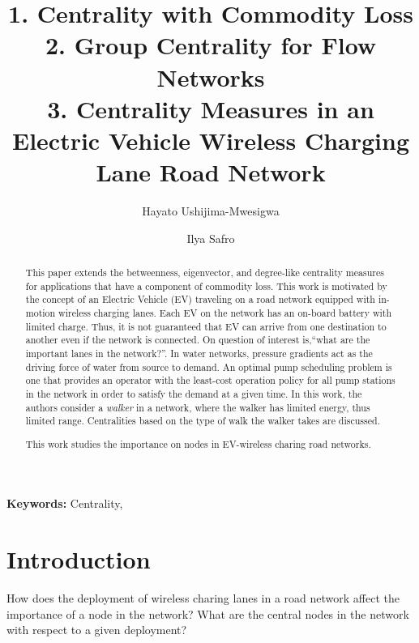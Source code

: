 \documentclass[envcountsame]{llncs}
\begin{document}
	
	
	\title{1. Centrality with Commodity Loss\\
    2. Group Centrality for Flow Networks\\
    3. Centrality Measures in an Electric Vehicle Wireless Charging Lane Road Network}
	\author{Hayato Ushijima-Mwesigwa \and Ilya Safro}

	\maketitle
	\begin{abstract}
This paper extends the betweenness, eigenvector, and degree-like centrality measures for applications that have a component of commodity loss.  This work is motivated by the concept of an Electric Vehicle (EV) traveling on a road network equipped with in-motion wireless charging lanes. Each EV on the network has an on-board battery with limited charge. Thus, it is not guaranteed that EV can arrive from one destination to another even if the network is connected. On question of interest is,``what are the important lanes in the network?''. In water networks, pressure gradients act as the driving force of water from source to demand.  An optimal pump scheduling problem is one that provides an operator with the least-cost operation policy for all pump stations in the network in order to satisfy the demand at a given time.  In this work, the authors consider a \emph{walker} in a network, where the walker has limited energy, thus limited range. Centralities based on the type of walk the walker takes are discussed. 

This work studies the importance on nodes in EV-wireless charing road networks. 
	\end{abstract}
	
	\noindent\textbf{Keywords:} Centrality,
	\section{Introduction}
 
 How does the deployment of wireless charing lanes in a road network affect the importance of a node in the network? What are the central nodes in the network with respect to a given deployment?
 
\end{document}
